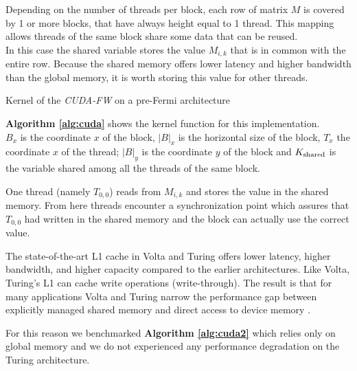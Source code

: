 Depending on the number of threads per block, each row  of matrix $M$ is covered by 1 or more blocks, that
have always height equal to 1 thread. This mapping allows threads of the same block share some data that can be reused. \\
In this case the shared variable stores the value $M_{i,k}$ that is in common with the entire row. Because the 
shared memory offers lower latency and higher bandwidth than the global memory, it is worth storing this value
for other threads.

\begin{algorithm}[h!]

\SetAlgoLined

\DontPrintSemicolon
 
\caption{Kernel of the \emph{CUDA-FW} on a pre-Fermi architecture}\label{alg:cuda}
\end{algorithm}

\textbf{Algorithm \ref*{alg:cuda}} shows the kernel function for this implementation. \\
$B_x$ is the coordinate $x$ of the block, $\left|B\right|_x$ is the horizontal size of the block, $T_x$ the 
coordinate $x$ of the thread; $\left|B\right|_y$ is the coordinate $y$ of the block and $K_{\textnormal{shared}}$ is the variable
shared among all the threads of the same block.

One thread (namely $T_{0,0}$) reads from $M_{i,k}$ and stores the value in the shared memory. From here threads encounter a synchronization point which
assures that $T_{0,0}$ had written in the shared memory and the block can actually use the correct value.

The state-of-the-art L1 cache in Volta and Turing offers lower latency, higher bandwidth, and higher capacity compared to the earlier architectures. Like Volta, Turing's L1 can cache write operations (write-through). The result is that for many applications Volta and Turing narrow the performance gap between explicitly managed shared memory and direct access to device memory \cite{nvidia}. \par
For this reason we benchmarked \textbf{Algorithm \ref*{alg:cuda2}} which relies only on global memory and we do not experienced any performance degradation on the Turing architecture.



